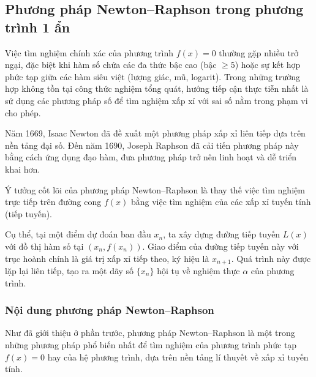 
\subsection{Phương pháp Newton–Raphson trong phương trình 1 ẩn}

Việc tìm nghiệm chính xác của phương trình $f(x)=0$ thường gặp nhiều trở ngại, đặc biệt khi hàm số chứa các đa thức bậc cao (bậc $\geq 5$) hoặc sự kết hợp phức tạp giữa các hàm siêu việt (lượng giác, mũ, logarit). Trong những trường hợp không tồn tại công thức nghiệm tổng quát, hướng tiếp cận thực tiễn nhất là sử dụng các phương pháp số để tìm nghiệm xấp xỉ với sai số nằm trong phạm vi cho phép.

Năm 1669, Isaac Newton đã đề xuất một phương pháp xấp xỉ liên tiếp dựa trên nền tảng đại số. Đến năm 1690, Joseph Raphson đã cải tiến phương pháp này bằng cách ứng dụng đạo hàm, đưa phương pháp trở nên linh hoạt và dễ triển khai hơn. 

Ý tưởng cốt lõi của phương pháp Newton–Raphson là thay thế việc tìm nghiệm trực tiếp trên đường cong $f(x)$ bằng việc tìm nghiệm của các xấp xỉ tuyến tính (tiếp tuyến).

Cụ thể, tại một điểm dự đoán ban đầu $x_n$, ta xây dựng đường tiếp tuyến $L(x)$ với đồ thị hàm số tại $(x_n, f(x_n))$. Giao điểm của đường tiếp tuyến này với trục hoành chính là giá trị xấp xỉ tiếp theo, ký hiệu là $x_{n+1}$. Quá trình này được lặp lại liên tiếp, tạo ra một dãy số $\{x_n\}$ hội tụ về nghiệm thực $\alpha$ của phương trình.


\subsubsection{Nội dung phương pháp Newton–Raphson}

Như đã giới thiệu ở phần trước, phương pháp Newton–Raphson là một trong những phương pháp phổ biến nhất để tìm nghiệm của phương trình phức tạp $f(x)=0$ hay của hệ phương trình, dựa trên nền tảng lí thuyết về xấp xỉ tuyến tính.

